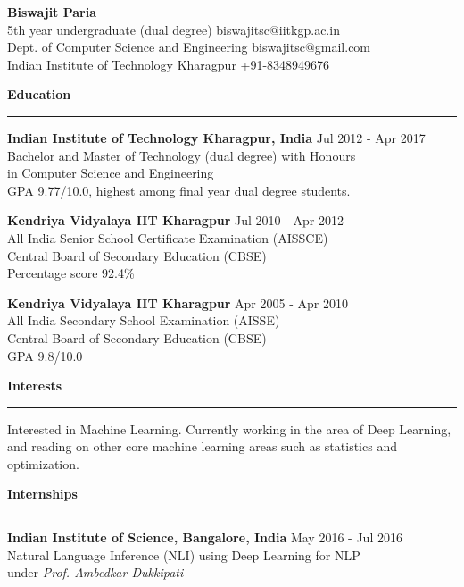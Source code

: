 \documentclass[10pt]{article}
\newcommand{\heading}[1]{
 {\large \textbf{#1}}
  \vspace{0.4em}
  \hrule
  \vspace{0.4em}
}
\newcommand{\EntryGap}{\vspace{0.8em}}
\newcommand{\SmallEntryGap}{\vspace{0.4em}}
\begin{document}

{\Large \textbf{Biswajit Paria}}\\
5th year undergraduate (dual degree) \hfill biswajitsc@iitkgp.ac.in\\
Dept. of Computer Science and Engineering \hfill biswajitsc@gmail.com\\
Indian Institute of Technology Kharagpur \hfill  +91-8348949676  
\EntryGap



\heading{Education}
\SmallEntryGap
\textbf{Indian Institute of Technology Kharagpur, India} \hfill Jul 2012 - Apr 2017\\
Bachelor and Master of Technology (dual degree) with Honours\\
in Computer Science and Engineering\\
GPA 9.77/10.0, highest among final year dual degree students.

\EntryGap
\textbf{Kendriya Vidyalaya IIT Kharagpur} \hfill Jul 2010 - Apr 2012\\
All India Senior School Certificate Examination (AISSCE)\\
Central Board of Secondary Education (CBSE)\\
Percentage score 92.4\%

\EntryGap
\textbf{Kendriya Vidyalaya IIT Kharagpur} \hfill Apr 2005 - Apr 2010\\
All India Secondary School Examination (AISSE)\\
Central Board of Secondary Education (CBSE)\\
GPA 9.8/10.0

\EntryGap


\heading{Interests}

\SmallEntryGap

Interested in Machine Learning. Currently working in the area of Deep Learning,
and reading on other core machine learning areas such as statistics
and optimization.

\EntryGap



\heading{Internships}

\textbf{Indian Institute of Science, Bangalore, India} \hfill May 2016 - Jul 2016\\
Natural Language Inference (NLI) using Deep Learning for NLP\\
under \emph{Prof. Ambedkar Dukkipati}
\end{document}
